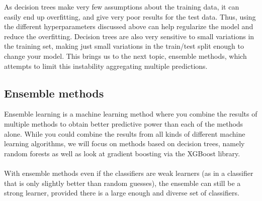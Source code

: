 \documentclass[a4paper]{article}
\newcommand\red[1]{\textcolor{red}{\textbf{#1}}}
\newcommand{\XX}{\mathbf{X}}
\begin{document}
As decision trees make very few assumptions about the training data, it can easily end up overfitting, and give very poor results for the test data. Thus, using the different hyperparameters discussed above can help regularize the model and reduce the overfitting. 
Decision trees are also very sensitive to small variations in the training set, making just small variations in the train/test split enough to change your model. This brings us to the next topic, ensemble methods, which attempts to limit this instability aggregating multiple predictions.%



\subsection{Ensemble methods} \label{sec:ensemble}
Ensemble learning is a machine learning method where you combine the results of multiple methods to obtain better predictive power than each of the methods alone. While you could combine the results from all kinds of different machine learning algorithms, we will focus on methods based on decision trees, namely random forests as well as look at gradient boosting via the XGBoost library.
\\\\
With ensemble methods even if the classifiers are weak learners (as in a classifier that is only slightly better than random guesses), the ensemble can still be a strong learner, provided there is a large enough and diverse set of classifiers.
\end{document}
